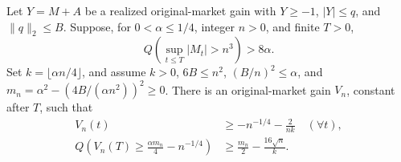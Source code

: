 \begin{lemma}
\label{lem:quantitative-47}
Let $Y=M+A$ be a realized original-market gain with $Y\geq-1$,
$|Y|\leq q$, and $\|q\|_2\leq B$.
Suppose, for $0<\alpha\leq1/4$, integer $n>0$, and finite $T>0$,
\[
 Q\left(\sup_{t\leq T}|M_t|>n^3\right)>8\alpha.
\]
Set $k=\lfloor\alpha n/4\rfloor$, and assume $k>0$,
$6B\leq n^2$, $(B/n)^2\leq\alpha$, and
$m_n=\alpha^2-(4B/(\alpha n^2))^2\geq0$.
There is an original-market gain $V_n$, constant after $T$, such that
\[
 \begin{aligned}
 V_n(t)&\geq-n^{-1/4}-\frac{2}{nk}\quad(\forall t),\\
 Q\left(V_n(T)\geq\frac{\alpha m_n}{4}-n^{-1/4}\right)
 &\geq\frac{m_n}{2}-\frac{16\sqrt n}{k}.
 \end{aligned}
\]
\end{lemma}
